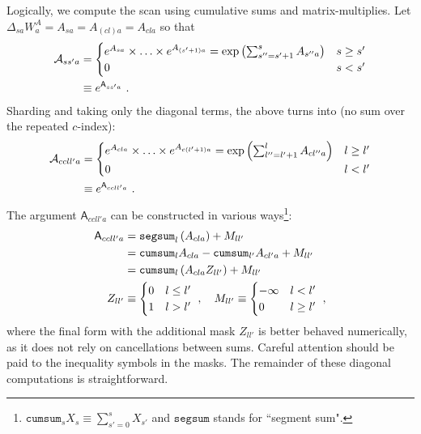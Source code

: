 Logically, we compute the scan using cumulative sums and matrix-multiplies. Let $ \Delta_{ sa  }W_{
a  }^{ A } = A_{ sa  } = A_{ (cl)a  }=A_{ cla } $ so that
\begin{align}
    \mathcal{A}_{ ss'a } &=
    \begin{cases}
    e^{ A_{ sa }}\times \ldots \times e^{   A_{ (s'+1)a }} =\exp\left ( \sum_{ s''=s'+1 }^{ s }A_{ s''a } \right ) & s \ge s' \\
    0 &  s < s'
    \end{cases}\nonumber\\
 &\equiv e^{ \mathsf{A}_{ ss'a } }\ .
\end{align}
Sharding and taking only the diagonal terms, the above turns into (no sum over the repeated $ c
$-index):
\begin{align}
    \mathcal{A}_{ ccll'a } &=
    \begin{cases}
    e^{ A_{ cla }}\times \ldots \times e^{   A_{ c(l'+1)a }} =\exp\left ( \sum_{ l''=l'+1 }^{ l }A_{ cl''a } \right ) & l \ge l' \\
    0 &  l < l'
    \end{cases}\nonumber\\
 &\equiv e^{ \mathsf{A}_{ ccll'a } }\ .
\end{align}
The argument $ \mathsf{A}_{ ccll'a } $ can be constructed in various ways\footnote{$
\texttt{cumsum}_{ s } X_s \equiv \sum_{ s'=0 }^{ s }X_{ s' } $ and $ \texttt{segsum} $ stands for
``segment sum".}:
\begin{align}
     \mathsf{A}_{ ccll'a }&= \texttt{segsum}_{ l }\left ( A_{ cla } \right ) + M _{ ll' }\nonumber\\
     &= \texttt{cumsum}_{ l }A_{ cla } - \texttt{cumsum}_{ l' }A_{ cl'a } + M_{ ll' } \nonumber\\
      &= \texttt{cumsum}_{ l }\left ( A_{ cla }Z_{ ll' } \right ) + M _{ ll' }\nonumber\\
       Z_{ ll' } &\equiv  \begin{cases}
           0 & l \le l'\\
           1 & l > l'
       \end{cases} \ , \quad
       M_{ ll' } \equiv  \begin{cases}
           -\infty & l < l'\\
           0 & l \ge l'
       \end{cases} \ , \label{app_eq_mamba2_diag_propagator}
\end{align}
where the final form with the additional mask $ Z_{ ll' } $ is better behaved numerically, as it
does not rely on cancellations between sums. Careful attention should be paid to the inequality
symbols in the masks.  The remainder of these diagonal computations is straightforward.

